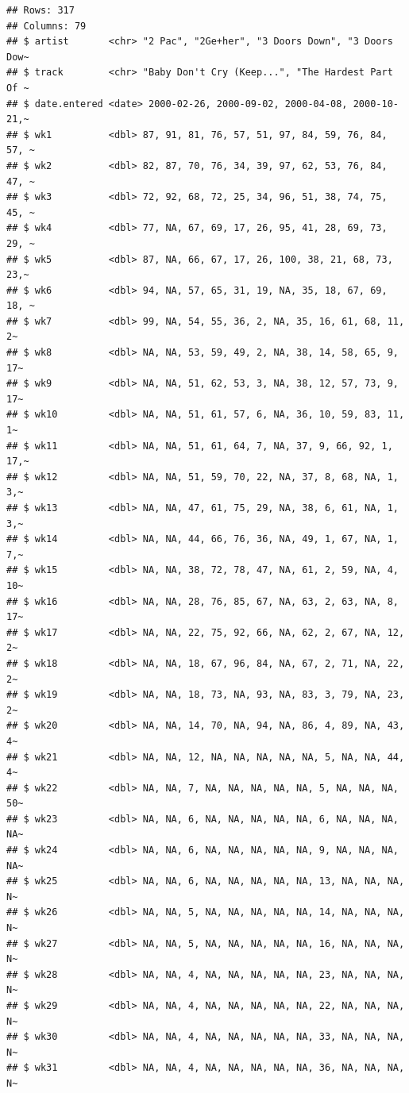 \documentclass[
  11pt]{report}
\begin{document}
\begin{itemize}
\begin{itemize}
\begin{verbatim}
## Rows: 317
## Columns: 79
## $ artist       <chr> "2 Pac", "2Ge+her", "3 Doors Down", "3 Doors Dow~
## $ track        <chr> "Baby Don't Cry (Keep...", "The Hardest Part Of ~
## $ date.entered <date> 2000-02-26, 2000-09-02, 2000-04-08, 2000-10-21,~
## $ wk1          <dbl> 87, 91, 81, 76, 57, 51, 97, 84, 59, 76, 84, 57, ~
## $ wk2          <dbl> 82, 87, 70, 76, 34, 39, 97, 62, 53, 76, 84, 47, ~
## $ wk3          <dbl> 72, 92, 68, 72, 25, 34, 96, 51, 38, 74, 75, 45, ~
## $ wk4          <dbl> 77, NA, 67, 69, 17, 26, 95, 41, 28, 69, 73, 29, ~
## $ wk5          <dbl> 87, NA, 66, 67, 17, 26, 100, 38, 21, 68, 73, 23,~
## $ wk6          <dbl> 94, NA, 57, 65, 31, 19, NA, 35, 18, 67, 69, 18, ~
## $ wk7          <dbl> 99, NA, 54, 55, 36, 2, NA, 35, 16, 61, 68, 11, 2~
## $ wk8          <dbl> NA, NA, 53, 59, 49, 2, NA, 38, 14, 58, 65, 9, 17~
## $ wk9          <dbl> NA, NA, 51, 62, 53, 3, NA, 38, 12, 57, 73, 9, 17~
## $ wk10         <dbl> NA, NA, 51, 61, 57, 6, NA, 36, 10, 59, 83, 11, 1~
## $ wk11         <dbl> NA, NA, 51, 61, 64, 7, NA, 37, 9, 66, 92, 1, 17,~
## $ wk12         <dbl> NA, NA, 51, 59, 70, 22, NA, 37, 8, 68, NA, 1, 3,~
## $ wk13         <dbl> NA, NA, 47, 61, 75, 29, NA, 38, 6, 61, NA, 1, 3,~
## $ wk14         <dbl> NA, NA, 44, 66, 76, 36, NA, 49, 1, 67, NA, 1, 7,~
## $ wk15         <dbl> NA, NA, 38, 72, 78, 47, NA, 61, 2, 59, NA, 4, 10~
## $ wk16         <dbl> NA, NA, 28, 76, 85, 67, NA, 63, 2, 63, NA, 8, 17~
## $ wk17         <dbl> NA, NA, 22, 75, 92, 66, NA, 62, 2, 67, NA, 12, 2~
## $ wk18         <dbl> NA, NA, 18, 67, 96, 84, NA, 67, 2, 71, NA, 22, 2~
## $ wk19         <dbl> NA, NA, 18, 73, NA, 93, NA, 83, 3, 79, NA, 23, 2~
## $ wk20         <dbl> NA, NA, 14, 70, NA, 94, NA, 86, 4, 89, NA, 43, 4~
## $ wk21         <dbl> NA, NA, 12, NA, NA, NA, NA, NA, 5, NA, NA, 44, 4~
## $ wk22         <dbl> NA, NA, 7, NA, NA, NA, NA, NA, 5, NA, NA, NA, 50~
## $ wk23         <dbl> NA, NA, 6, NA, NA, NA, NA, NA, 6, NA, NA, NA, NA~
## $ wk24         <dbl> NA, NA, 6, NA, NA, NA, NA, NA, 9, NA, NA, NA, NA~
## $ wk25         <dbl> NA, NA, 6, NA, NA, NA, NA, NA, 13, NA, NA, NA, N~
## $ wk26         <dbl> NA, NA, 5, NA, NA, NA, NA, NA, 14, NA, NA, NA, N~
## $ wk27         <dbl> NA, NA, 5, NA, NA, NA, NA, NA, 16, NA, NA, NA, N~
## $ wk28         <dbl> NA, NA, 4, NA, NA, NA, NA, NA, 23, NA, NA, NA, N~
## $ wk29         <dbl> NA, NA, 4, NA, NA, NA, NA, NA, 22, NA, NA, NA, N~
## $ wk30         <dbl> NA, NA, 4, NA, NA, NA, NA, NA, 33, NA, NA, NA, N~
## $ wk31         <dbl> NA, NA, 4, NA, NA, NA, NA, NA, 36, NA, NA, NA, N~

\end{verbatim}
\end{itemize}
\end{itemize}
\end{document}
